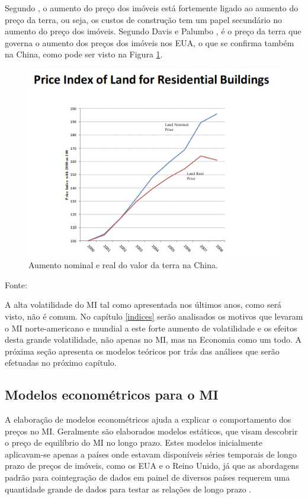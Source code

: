\documentclass[
	12pt,				%
	oneside,			%
	a4paper,			%
	chapter=TITLE,		%
	section=TITLE,		%
	english,			%
	brazil				%
	]{abntex2}
\newcommand{\bcenter}{\begin{center}}
\newcommand{\ecenter}{\end{center}}
\begin{document}
Segundo \textcite[p.~4-5]{regulation}, o aumento do preço dos imóveis está fortemente
ligado ao aumento do preço da terra, ou seja, os custos de construção tem um
papel secundário no aumento do preço dos imóveis. Segundo Davis e Palumbo
\autocite[\emph{apud}][p.~4]{regulation}, é o preço da terra que governa o aumento dos preços
dos imóveis nos EUA, o que se confirma também na China, como pode ser visto na
Figura \ref{fig:land}.
\begin{figure}[H]

{\centering \includegraphics[width=0.7\linewidth]{images/land} 

}

\caption{Aumento nominal e real do valor da terra na China.}\label{fig:land}
\end{figure}
\bcenter

Fonte: \textcite[p.~5]{regulation}
\ecenter

A alta volatilidade do \gls{MI} tal como apresentada nos últimos anos, como será
visto, não é comum. No capítulo \ref{indices} serão analisados os motivos que
levaram o \gls{MI} norte-americano e mundial a este forte aumento de
volatilidade e os efeitos desta grande volatilidade, não apenas no \gls{MI}, mas
na Economia como um todo. A próxima seção apresenta os modelos teóricos por trás
das análises que serão efetuadas no próximo capítulo.

\hypertarget{modelos-economuxe9tricos-para-o}{%
\subsection{\texorpdfstring{Modelos econométricos para o \gls{MI}}{Modelos econométricos para o }}\label{modelos-economuxe9tricos-para-o}}

A elaboração de modelos econométricos ajuda a explicar o comportamento dos
preços no \gls{MI}. Geralmente são elaborados modelos estáticos, que visam
descobrir o preço de equilíbrio do \gls{MI} no longo prazo. Estes modelos
inicialmente aplicavam-se apenas a países onde estavam disponíveis séries
temporais de longo prazo de preços de imóveis, como os EUA e o Reino Unido, já
que as abordagens padrão para cointegração de dados em painel de diversos países
requerem uma quantidade grande de dados para testar as relações de longo prazo
\autocite[2]{ADAMS2010}.
\end{document}
